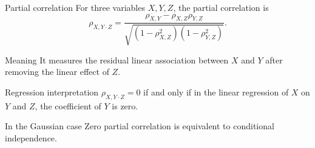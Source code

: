 \documentclass[dvipsnames,aspectratio=169,handout]{beamer}
\begin{document}
\begin{frame}{Partial correlation}
For three variables $X,Y,Z$, the partial correlation is
\[
\rho_{X,Y\cdot Z}
=
\frac{\rho_{X,Y}-\rho_{X,Z}\rho_{Y,Z}}
{\sqrt{(1-\rho_{X,Z}^2)(1-\rho_{Y,Z}^2)}}.
\]

\begin{block}{Meaning}
It measures the residual linear association between $X$ and $Y$
after removing the linear effect of $Z$.
\end{block}

\begin{alertblock}{Regression interpretation}
$\rho_{X,Y\cdot Z}=0$ if and only if in the linear regression of $X$ on $Y$ and $Z$,
the coefficient of $Y$ is zero.
\end{alertblock}

\begin{block}{In the Gaussian case}
Zero partial correlation is equivalent to conditional independence.
\end{block}
\end{frame}

%
%
\end{document}

